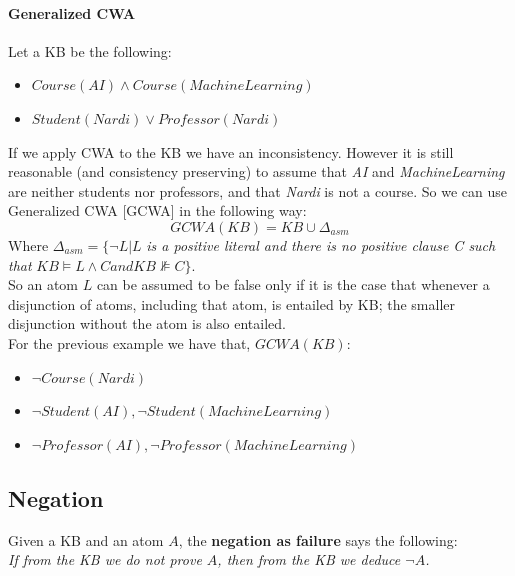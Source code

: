 \documentclass[10pt,a4paper]{article}
\begin{document}
\paragraph{Generalized CWA}
Let a KB be the following:
\begin{itemize}
\item $Course(AI) \wedge Course(MachineLearning)$
\item $Student(Nardi) \vee Professor(Nardi)$
\end{itemize}
If we apply CWA to the KB we have an inconsistency. However it is still reasonable (and consistency preserving) to assume that \textit{AI} and \textit{MachineLearning} are neither students nor professors, 
and that \textit{Nardi} is not a course. So we can use Generalized CWA [GCWA] in the following way:
\[GCWA(KB)=KB\cup \Delta_{asm}\]
Where $\Delta_{asm}= \lbrace \neg L | L$ \textit{is a positive literal and there is no positive clause C
such that} $KB \models L\wedge C and KB \nVDash C \rbrace$.\\
So an atom $L$ can be assumed to be false only if it is the case that whenever a disjunction of atoms, including that atom, is entailed by KB; the smaller disjunction without the atom is also entailed.\\
For the previous example we have that, $GCWA(KB)$:
\begin{itemize}
\item $\neg Course(Nardi)$
\item $\neg Student(AI), \neg Student(MachineLearning)$
\item $\neg Professor(AI), \neg Professor(MachineLearning)$
\end{itemize}

\subsection{Negation}
Given a KB and an atom $A$, the \textbf{negation as failure} says the following:\\
\textit{If from the KB we do not prove $A$, then from the KB we deduce $\neg A$.}\\
\end{document}
